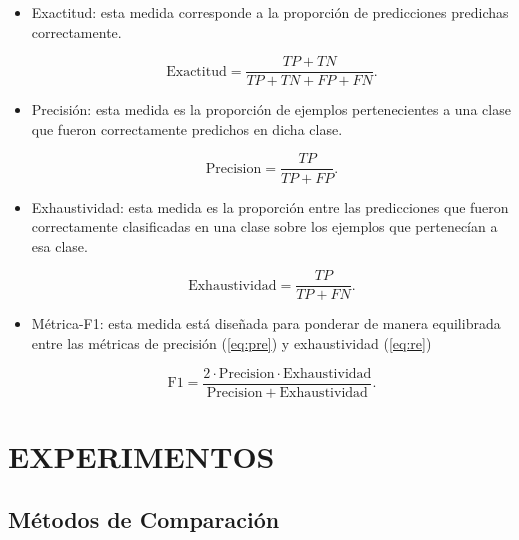 \begin{itemize}
    \item Exactitud: esta medida corresponde a la proporción de predicciones predichas correctamente.

    \begin{equation}
        \mathrm{Exactitud}= \frac{TP+TN}{TP+TN+FP+FN}.
        \label{eq:acc}
    \end{equation}


    \item Precisión: esta medida es la proporción de ejemplos pertenecientes a una clase que fueron correctamente predichos en dicha clase.
    
        \begin{equation}
            \mathrm{Precision} = \frac{TP}{TP+FP}.
            \label{eq:pre}
        \end{equation}
        
    \item Exhaustividad: esta medida es la proporción entre las predicciones que fueron correctamente clasificadas en una clase sobre los ejemplos que pertenecían a esa clase.
    
    \begin{equation}
        \mathrm{Exhaustividad}= \frac{TP}{TP+FN}.
        \label{eq:re}
    \end{equation}

    \item Métrica-F1: esta medida está diseñada para ponderar de manera equilibrada entre las métricas de precisión (\ref{eq:pre}) y exhaustividad (\ref{eq:re}) 
    
    \begin{equation}
        \mathrm{F1} = \frac{2\cdot\mathrm{Precision}\cdot\mathrm{Exhaustividad}}{\mathrm{Precision}+\mathrm{Exhaustividad}}.
        \label{eq:f1}
    \end{equation}

\end{itemize}

\section{EXPERIMENTOS}

\subsection{Métodos de Comparación}

